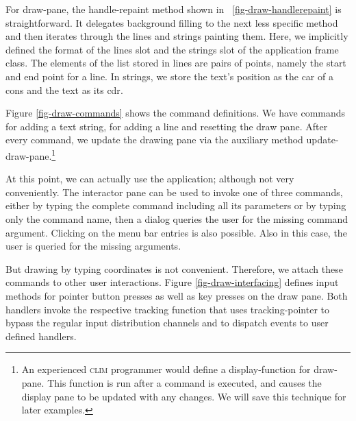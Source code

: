 \documentclass[twocolumn,a4paper]{article}
\newcommand {\code}[1]{{\sffamily #1}}
\newcommand {\CLIM}{\textsc{clim}}
\let\class\code
\let\method\code
\let\constant\code
\let\macro\code
\let\keyword\code
\begin{document}
For \class{draw-pane}, the \method{handle-repaint} method shown in
\figurename~\ref{fig-draw-handlerepaint} is straightforward. It
delegates background filling to the next less specific method and then
iterates through the lines and strings painting them. Here, we
implicitly defined the format of the \code{lines} slot and the
\code{strings} slot of the application frame class. The elements of
the list stored in \code{lines} are pairs of points, namely the start
and end point for a line. In \code{strings}, we store the text's
position as the \code{car} of a cons and the text as its \code{cdr}.



Figure \ref{fig-draw-commands} shows the command definitions. We have
commands for adding a text string, for adding a line and resetting the
draw pane. After every command, we update the drawing pane via the
auxiliary method \method{update-draw-pane}.\footnote{An experienced
\CLIM{} programmer would define a display-function for
\class{draw-pane}. This function is run after a command is
executed, and causes the display pane to be updated with any changes. We 
will save this technique for later examples.}

At this point, we can actually use the application; although not very
conveniently. The interactor pane can be used to invoke one of three
commands, either by typing the complete command including all its
parameters or by typing only the command name, then a dialog queries
the user for the missing command argument. Clicking on the menu bar
entries is also possible. Also in this case, the user is queried for
the missing arguments.

But drawing by typing coordinates is not convenient. Therefore, we
attach these commands to other user interactions.  Figure
\ref{fig-draw-interfacing} defines input methods for pointer button
presses as well as key presses on the draw pane. Both handlers invoke
the respective tracking function that uses \macro{tracking-pointer} to
bypass the regular input distribution channels and to dispatch events
to user defined handlers.
\end{document}
